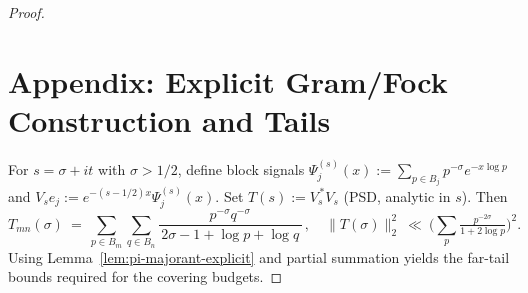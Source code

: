 \documentclass[11pt]{article}
\theoremstyle{definition}
\theoremstyle{remark}
\begin{document}
\begin{proof}
\medskip
\section*{Appendix: Explicit Gram/Fock Construction and Tails}\label{sec:appendix}
For $s=\sigma+it$ with $\sigma>1/2$, define block signals $\Psi_j^{(s)}(x):=\sum_{p\in B_j} p^{-\sigma}e^{-x\log p}$ and $V_s e_j:= e^{-(s-1/2)x}\Psi_j^{(s)}(x)$. Set $T(s):=V_s^{\,*}V_s$ (PSD, analytic in $s$). Then
\[
T_{mn}(\sigma)\ =\ \sum_{p\in B_m}\sum_{q\in B_n}\frac{p^{-\sigma}q^{-\sigma}}{\,2\sigma-1+\log p+\log q\,}\,,\quad \|T(\sigma)\|_2^2\ \ll\ \Big(\sum_p \tfrac{p^{-2\sigma}}{1+2\log p}\Big)^2.
\]
Using Lemma~\ref{lem:pi-majorant-explicit} and partial summation yields the far-tail bounds required for the covering budgets.

\iffalse %
\clearpage
% 

\clearpage


\clearpage


\clearpage


\clearpage
% 
\fi %

\clearpage


\clearpage


\clearpage


\clearpage


\clearpage


\clearpage


\clearpage

\clearpage



\end{proof}
\end{document}
